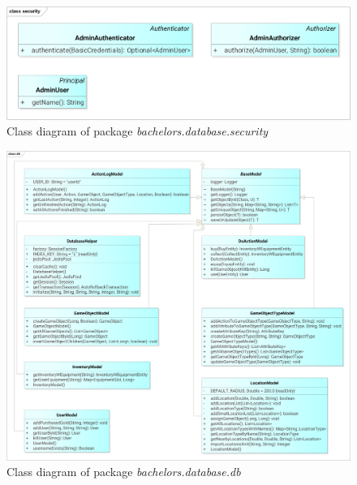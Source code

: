 \begin{figure}[h]	
	\includegraphics[width=\textwidth]{figures/classdiagrams/dssecurity}
	\centering			
	\caption{Class diagram of package \textit{bachelors.database.security}}
\end{figure}

\begin{figure}[h]	
	\includegraphics[width=\textwidth]{figures/classdiagrams/dsdb}
	\centering			
	\caption{Class diagram of package \textit{bachelors.database.db}}
	\label{fig:models}
\end{figure}

